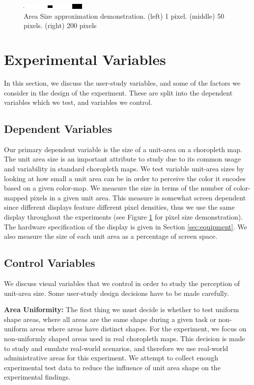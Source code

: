 \begin{figure}[b]
\centering
\includegraphics[scale=1]{images/pixelSize} \vspace{0.1cm}
\caption{Area Size approximation demonstration.  (left) 1 pixel. (middle) 50 pixels. (right) 200 pixels} \label{fig:pixels}
\end{figure}
\section{Experimental Variables} \label{sec:variables}
In this section, we discuss the user-study variables, and some of the factors we consider in the design of the experiment. These are split into the dependent variables which we test, and variables we control.

\subsection{Dependent Variables}
Our primary dependent variable is the size of a unit-area on a choropleth map. The unit area size is an important attribute to study due to its common usage and variability in standard choropleth maps. We test variable unit-area sizes by looking at how small a unit area can be in order to perceive the color it encodes based on a given color-map. We measure the size in terms of the number of color-mapped pixels in a given unit area. This measure is somewhat screen dependent since different displays feature different pixel densities, thus we use the same display throughout the experiments (see Figure \ref{fig:pixels} for pixel size demonstration). The hardware specification of the display is given in Section \ref{sec:equipment}. We also measure the size of each unit area as a percentage of screen space.

\subsection{Control Variables}
We discuss visual variables that we control in order to study the perception of unit-area size. Some user-study design decisions have to be made carefully.

\textbf{Area Uniformity: } The first thing we must decide is whether to test uniform shape areas, where all areas are the same shape during a given task or non-uniform areas where areas have distinct shapes. For the experiment, we focus on non-uniformly shaped areas used in real choropleth maps. This decision is made to study and emulate real-world scenarios, and therefore we use real-world administrative areas for this experiment. We attempt to collect enough experimental test data to reduce the influence of unit area shape on the experimental findings.


